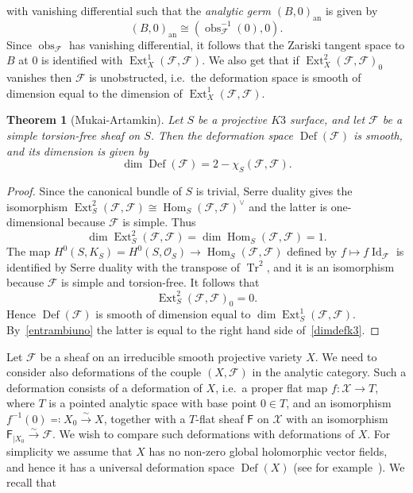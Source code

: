 \documentclass[11pt]{amsart}
\let\mathcal\mathscr
\def\cF{\mathcal{F}}
\def\cO{\mathcal{O}}
\def\cX{\mathcal{X}}
\def\sF{{\mathsf F}}
\DeclareMathOperator{\an}{an}
\DeclareMathOperator{\Def}{Def}
\DeclareMathOperator{\Ext}{Ext}
\DeclareMathOperator{\Hom}{Hom}
\DeclareMathOperator{\Id}{Id}
\DeclareMathOperator{\obs}{obs}
\DeclareMathOperator{\Tr}{Tr}
\newtheorem{thm}[lmm]{Theorem}
\theoremstyle{definition}
\theoremstyle{remark}
\begin{document}
%
 with vanishing differential such that the \emph{analytic germ} $(B,0)_{\an}$ is given by
%
\begin{equation}
%
(B,0)_{\an}\cong (\obs_{\cF}^{-1}(0),0).
%
\end{equation}
%
Since $\obs_{\cF}$ has vanishing differential, it follows that the Zariski tangent space to $B$ at $0$ is identified with $\Ext^1_X(\cF,\cF)$. We also get that  if $\Ext^2_X(\cF,\cF)_0$ vanishes then $\cF$ is unobstructed, i.e.~the deformation space is smooth of dimension equal to 
the dimension of $\Ext^1_X(\cF,\cF)$. 
%
\begin{thm}[Mukai-Artamkin]\label{thm:mukart}
%
Let $S$ be  a projective $K3$ surface, and let
$\cF$ be a simple torsion-free sheaf on $S$. Then the deformation space $\Def(\cF)$ is smooth, and its dimension is given by
%
\begin{equation}\label{dimdefk3}
%
\dim\Def(\cF)=2-\chi_S(\cF,\cF).
%
\end{equation}
%
%
\end{thm}
%
%
\begin{proof}
%
Since the canonical bundle of $S$ is trivial, Serre duality gives the isomorphism $\Ext^2_S(\cF,\cF)\cong\Hom_S(\cF,\cF)^{\vee}$ and the latter is 
one-dimensional because $\cF$ is simple. Thus
%
\begin{equation}\label{entrambiuno}
%
\dim \Ext^2_S(\cF,\cF)=\dim\Hom_S(\cF,\cF)=1.
%
\end{equation}
%
The map  $H^0(S,K_S)=H^0(S,\cO_S)\to \Hom_S(\cF,\cF)$ defined by $f\mapsto f\Id_{\cF}$ is identified by Serre duality with the transpose
 of $\Tr^2$, and it is an isomorphism because $\cF$ is simple and torsion-free. It follows that  
\begin{equation}\label{oboemarcello}
%
 \Ext^2_S(\cF,\cF)_0=0.
%
\end{equation}
%
Hence 
 $\Def(\cF)$ is smooth of dimension equal to $\dim\Ext^1_S(\cF,\cF)$. By~\eqref{entrambiuno} the latter is equal to the right hand side of~\eqref{dimdefk3}.
\end{proof}
%
Let $\cF$ be a sheaf on an irreducible smooth projective variety $X$. We need to consider also deformations of the couple $(X,\cF)$ in the analytic category. Such a deformation consists of a deformation of $X$, i.e.~a proper flat map $f\colon \cX\to T$, where $T$ is a pointed analytic space with base point $0\in T$, and an isomorphism 
$f^{-1}(0)\eqqcolon X_0\xrightarrow{\sim}X$, together with a $T$-flat sheaf $\sF$ on $\cX$ with an isomorphism 
$\sF_{|X_0}\xrightarrow{\sim}\cF$. We wish to compare such deformations with deformations of $X$. For simplicity we assume that $X$ has no non-zero global holomorphic vector fields, and hence it has a universal deformation space $\Def(X)$ (see for example~\cite{manetti-libro}). We recall that 
\end{document}

